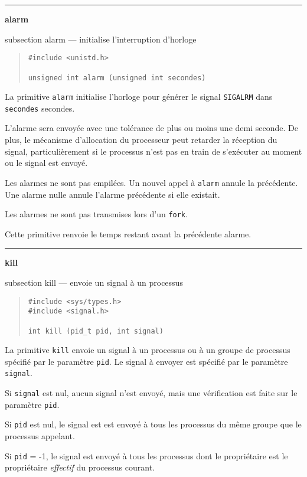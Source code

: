 \documentclass [twoside] {report}
\newcommand {\primitive} [1]
    {
	{\large \bf #1}
	\addcontentsline {toc} {subsection} {#1}
    }
\newcommand {\separation}
    {
	\vspace {7mm}
	\nopagebreak
	\hrule
    }
\begin{document}
\separation
\primitive {alarm} --- initialise l'interruption d'horloge

\begin {quote}
\begin {verbatim}
#include <unistd.h>

unsigned int alarm (unsigned int secondes)
\end{verbatim}
\end {quote}

La primitive {\tt alarm} initialise l'horloge pour
générer le signal {\tt SIGALRM} dans {\tt secondes}
secondes.

L'alarme sera envoyée avec une tolérance de plus ou
moins une demi seconde. De plus, le mécanisme
d'allocation du processeur peut retarder la
réception du signal, particulièrement si le
processus n'est pas en train de s'exécuter au
moment ou le signal est envoyé.

Les alarmes ne sont pas empilées. Un nouvel appel
à {\tt alarm} annule la précédente. Une alarme nulle
annule l'alarme précédente si elle existait.

Les alarmes ne sont pas transmises lors d'un
{\tt fork}.

Cette primitive renvoie le temps restant avant la
précédente alarme.




\separation
\primitive {kill} --- envoie un signal à un processus
    \label {kill}

\begin {quote}
\begin {verbatim}
#include <sys/types.h>
#include <signal.h>

int kill (pid_t pid, int signal)
\end{verbatim}
\end {quote}

La primitive {\tt kill} envoie un signal à un
processus ou à un groupe de processus spécifié par
le paramètre {\tt pid}. Le signal à envoyer est
spécifié par le paramètre {\tt signal}.

Si {\tt signal} est nul, aucun signal n'est envoyé,
mais une vérification est faite
sur le paramètre {\tt pid}.

Si {\tt pid} est nul, le signal est est envoyé à tous
les processus du même groupe que le processus
appelant.

Si {\tt pid} = -1, le signal est envoyé à tous les
processus dont le propriétaire est le propriétaire
{\it effectif} du processus courant.
\end{document}
